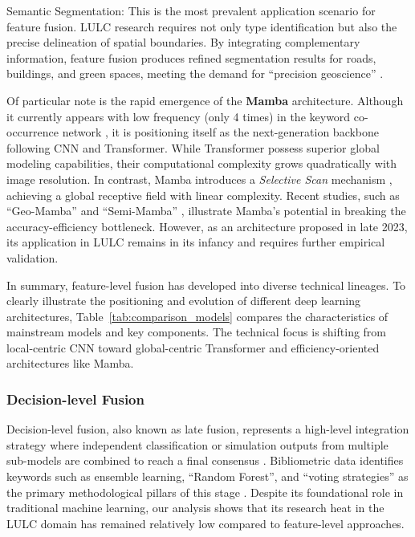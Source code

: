 \documentclass[]{interact}
\theoremstyle{plain}%
\theoremstyle{definition}
\theoremstyle{remark}
\begin{document}
\medskip
Semantic Segmentation: This is the most prevalent application scenario for feature fusion. LULC research requires not only type identification but also the precise delineation of spatial boundaries. By integrating complementary information, feature fusion produces refined segmentation results for roads, buildings, and green spaces, meeting the demand for ``precision geoscience'' \citep{45,48}.

Of particular note is the rapid emergence of the \textbf{Mamba} architecture. Although it currently appears with low frequency (only 4 times) in the keyword co-occurrence network \citep{49,5,51,52}, it is positioning itself as the next-generation backbone following CNN and Transformer. While Transformer possess superior global modeling capabilities, their computational complexity grows quadratically with image resolution. In contrast, Mamba introduces a \textit{Selective Scan} mechanism \citep{53}, achieving a global receptive field with linear complexity. Recent studies, such as ``Geo-Mamba'' \citep{49} and ``Semi-Mamba'' \citep{51}, illustrate Mamba's potential in breaking the accuracy-efficiency bottleneck. However, as an architecture proposed in late 2023, its application in LULC remains in its infancy and requires further empirical validation.

In summary, feature-level fusion has developed into diverse technical lineages. To clearly illustrate the positioning and evolution of different deep learning architectures, Table~\ref{tab:comparison_models} compares the characteristics of mainstream models and key components. The technical focus is shifting from local-centric CNN toward global-centric Transformer and efficiency-oriented architectures like Mamba.



\subsubsection{Decision-level Fusion}
Decision-level fusion, also known as late fusion, represents a high-level integration strategy where independent classification or simulation outputs from multiple sub-models are combined to reach a final consensus \citep{ORIGPu2023DecisionFusion}. Bibliometric data identifies keywords such as ensemble learning, ``Random Forest'', and ``voting strategies'' as the primary methodological pillars of this stage \citep{55}. Despite its foundational role in traditional machine learning, our analysis shows that its research heat in the LULC domain has remained relatively low compared to feature-level approaches.
\end{document}
